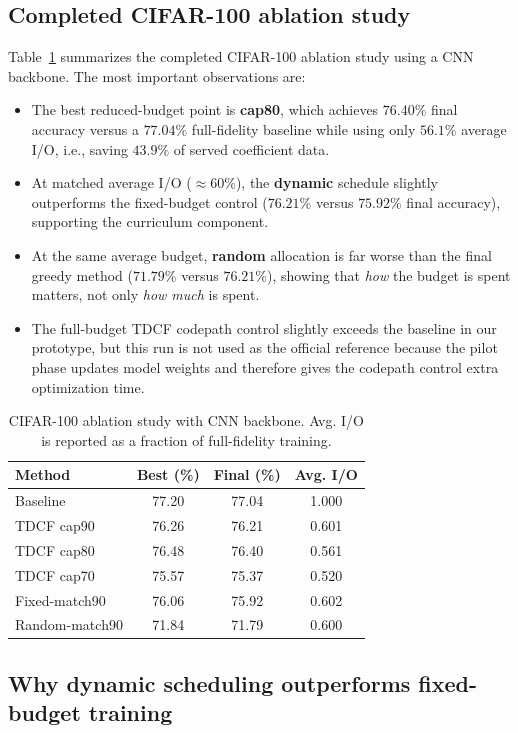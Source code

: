 \documentclass[10pt,twocolumn]{article}
\begin{document}
\subsection{Completed CIFAR-100 ablation study}
Table~\ref{tab:cifar_ablation} summarizes the completed CIFAR-100 ablation study using a CNN backbone. The most important observations are:
\begin{itemize}
    \item The best reduced-budget point is \textbf{cap80}, which achieves $76.40\%$ final accuracy versus a $77.04\%$ full-fidelity baseline while using only $56.1\%$ average I/O, i.e., saving $43.9\%$ of served coefficient data.
    \item At matched average I/O ($\approx 60\%$), the \textbf{dynamic} schedule slightly outperforms the fixed-budget control ($76.21\%$ versus $75.92\%$ final accuracy), supporting the curriculum component.
    \item At the same average budget, \textbf{random} allocation is far worse than the final greedy method ($71.79\%$ versus $76.21\%$), showing that \emph{how} the budget is spent matters, not only \emph{how much} is spent.
    \item The full-budget TDCF codepath control slightly exceeds the baseline in our prototype, but this run is not used as the official reference because the pilot phase updates model weights and therefore gives the codepath control extra optimization time.
\end{itemize}

\begin{table}[t]
\centering
\small
\caption{CIFAR-100 ablation study with CNN backbone. Avg. I/O is reported as a fraction of full-fidelity training.}
\label{tab:cifar_ablation}
\begin{tabular}{lccc}
\toprule
Method & Best (\%) & Final (\%) & Avg. I/O \\
\midrule
Baseline & 77.20 & 77.04 & 1.000 \\
TDCF cap90 & 76.26 & 76.21 & 0.601 \\
TDCF cap80 & 76.48 & 76.40 & 0.561 \\
TDCF cap70 & 75.57 & 75.37 & 0.520 \\
Fixed-match90 & 76.06 & 75.92 & 0.602 \\
Random-match90 & 71.84 & 71.79 & 0.600 \\
\bottomrule
\end{tabular}
\end{table}

\subsection{Why dynamic scheduling outperforms fixed-budget training}
\end{document}
